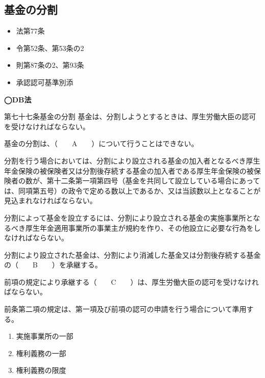 \newpage

\subsection{基金の分割}

\begin{InyouJobunbox}
  \begin{itemize}
    \item 法第77条
    \item 令第52条、第53条の2
    \item 則第87条の2、第93条
    \item 承認認可基準別添
  \end{itemize}
\end{InyouJobunbox}

\begin{fillblank}[年金1 H29 問題1(1)C、D、E]
  \noindent \textbf{◯DB法}
  \begin{lawstructure}
    \begin{lawarticle}{第七十七条}{基金の分割}
      基金は、分割しようとするときは、厚生労働大臣の認可を受けなければならない。

      基金の分割は、（　　A　　）について行うことはできない。

      分割を行う場合においては、分割により設立される基金の加入者となるべき厚生年金保険の被保険者又は分割後存続する基金の加入者である厚生年金保険の被保険者の数が、第十二条第一項第四号（基金を共同して設立している場合にあっては、同項第五号）の政令で定める数以上であるか、又は当該数以上となることが見込まれなければならない。

      分割によって基金を設立するには、分割により設立される基金の実施事業所となるべき厚生年金適用事業所の事業主が規約を作り、その他設立に必要な行為をしなければならない。

      分割により設立された基金は、分割により消滅した基金又は分割後存続する基金の（　　B　　）を承継する。

      前項の規定により承継する（　　C　　）は、厚生労働大臣の認可を受けなければならない。

      前条第二項の規定は、第一項及び前項の認可の申請を行う場合について準用する。
    \end{lawarticle}
  \end{lawstructure}
\end{fillblank}

\begin{answerbox}
  \begin{enumerate}[A: ]
    \item 実施事業所の一部
    \item 権利義務の一部
    \item 権利義務の限度
  \end{enumerate}
\end{answerbox}

